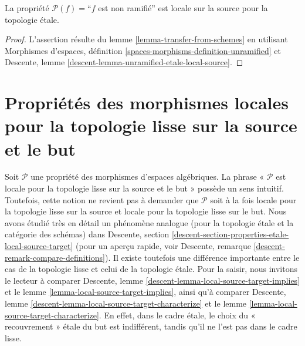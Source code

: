 \begin{lemma}
\label{lemma-unramified-etale-local-source}
La propriété $\mathcal{P}(f)=$``$f$ est non ramifié''
est locale sur la source pour la topologie \'etale.
\end{lemma}

\begin{proof}
L'assertion résulte du
lemme \ref{lemma-transfer-from-schemes}
en utilisant
Morphismes d'espaces, définition \ref{spaces-morphisms-definition-unramified}
et
Descente, lemme \ref{descent-lemma-unramified-etale-local-source}.
\end{proof}


\section{Propriétés des morphismes locales pour la topologie lisse sur la source et le but}
\label{section-properties-local-source-target}

\noindent
Soit $\mathcal{P}$ une propriété des morphismes d'espaces algébriques. La phrase
« $\mathcal{P}$ est locale pour la topologie lisse sur la
source et le but » possède un sens intuitif. Toutefois, cette notion ne revient
pas à demander que $\mathcal{P}$ soit à la fois locale pour la topologie lisse
sur la source et locale pour la topologie lisse sur le but.
Nous avons étudié très en détail un phénomène analogue (pour la topologie \'etale
et la catégorie des schémas) dans
Descente, section \ref{descent-section-properties-etale-local-source-target}
(pour un aperçu rapide, voir
Descente, remarque \ref{descent-remark-compare-definitions}).
Il existe toutefois une différence importante entre le cas de la topologie lisse
et celui de la topologie \'etale. Pour la saisir, nous invitons le lecteur
à comparer
Descente, lemme \ref{descent-lemma-local-source-target-implies}
et
le lemme \ref{lemma-local-source-target-implies},
ainsi qu'à comparer
Descente, lemme \ref{descent-lemma-local-source-target-characterize}
et
le lemme \ref{lemma-local-source-target-characterize}.
En effet, dans le cadre étale, le choix du « recouvrement » étale du
but est indifférent, tandis qu'il ne l'est pas dans le cadre lisse.

